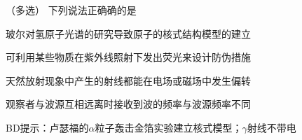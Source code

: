 （多选）
下列说法正确确的是\paren[BD]
\begin{choices}
	\item 玻尔对氢原子光谱的研究导致原子的核式结构模型的建立
	\item 可利用某些物质在紫外线照射下发出荧光来设计防伪措施
	\item 天然放射现象中产生的射线都能在电场或磁场中发生偏转
	\item 观察者与波源互相远离时接收到波的频率与波源频率不同
\end{choices}
\begin{answer}
	BD\qquad 提示：卢瑟福的\(\alpha\)粒子轰击金箔实验建立核式模型；\(\gamma\)射线不带电
\end{answer}